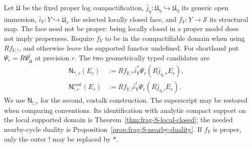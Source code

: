 \documentclass[11pt]{article}
\theoremstyle{definition}
\theoremstyle{remark}
\begin{document}
Let $\overline{\mathfrak U}$ be the fixed proper log compactification,
$\bar j_\eta:\mathfrak U_{\bar\eta}\hookrightarrow
\overline{\mathfrak U}_{\bar\eta}$ its generic open immersion,
$\bar i_Y:Y\hookrightarrow\overline{\mathfrak U}_s$ the selected locally
closed face, and $f_Y:Y\to\mathscr S$ its structural map.
The face need not be proper: being locally closed in a proper model does
not imply properness.  Require $f_Y$ to be in the compactifiable domain when
using $Rf_{Y,!}$, and otherwise leave the supported functor undefined.
For shorthand put $\Psi_r=R\Psi^t_{\overline{\mathfrak U}}$ at precision $r$.
The two geometrically typed candidates are
\begin{equation}
\begin{aligned}
\mathsf N_{*,r}(E_r)&:=
Rf_{Y,*}\bar i_Y^*\Psi_r(R\bar j_{\eta,*}E_r),\\
\mathsf N_{!,r}^{\mathrm{cost}}(E_r)&:=
Rf_{Y,!}\bar i_Y^!\Psi_r(R\bar j_{\eta,!}E_r).
\end{aligned}
\label{eq:frag-nearby-star-shriek-definition}
\end{equation}
We use $\mathsf N_{!,r}$ for the second, costalk construction.  The superscript
may be restored when comparing conventions.  Its identification with analytic
compact support on the local supported domain is
Theorem~\ref{thm:frag-S-local-closed}; the needed nearby-cycle
duality is Proposition~\ref{prop:frag-S-nearby-duality}.  If $f_Y$ is proper, only the outer $!$ may be
replaced by $*$.
\end{document}
